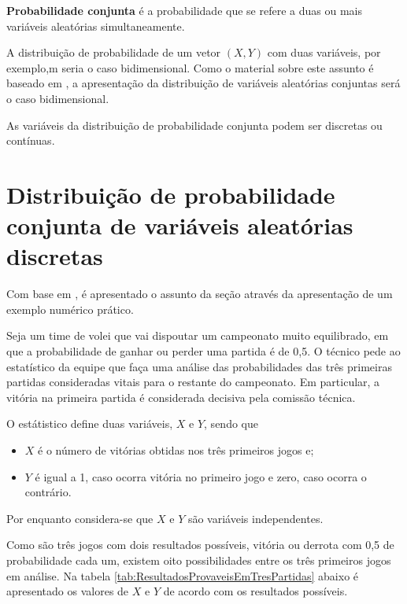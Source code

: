 \documentclass[
]{book}
\begin{document}
\textbf{Probabilidade conjunta} é a probabilidade que se refere a duas ou mais variáveis aleatórias simultaneamente.

A distribuição de probabilidade de um vetor \((X,Y)\) com duas variáveis, por exemplo,m seria o caso bidimensional. Como o material sobre este assunto é baseado em \citet{Sartoris2013}, a apresentação da distribuição de variáveis aleatórias conjuntas será o caso bidimensional.

As variáveis da distribuição de probabilidade conjunta podem ser discretas ou contínuas.

\hypertarget{distribuiuxe7uxe3o-de-probabilidade-conjunta-de-variuxe1veis-aleatuxf3rias-discretas}{%
\section{Distribuição de probabilidade conjunta de variáveis aleatórias discretas}\label{distribuiuxe7uxe3o-de-probabilidade-conjunta-de-variuxe1veis-aleatuxf3rias-discretas}}

Com base em \citet{Sartoris2013}, é apresentado o assunto da seção através da apresentação de um exemplo numérico prático.

Seja um time de volei que vai dispoutar um campeonato muito equilibrado, em que a probabilidade de ganhar ou perder uma partida é de 0,5. O técnico pede ao estatístico da equipe que faça uma análise das probabilidades das três primeiras partidas consideradas vitais para o restante do campeonato. Em particular, a vitória na primeira partida é considerada decisiva pela comissão técnica.

O estátistico define duas variáveis, \(X\) e \(Y\), sendo que

\begin{itemize}
\item
  \(X\) é o número de vitórias obtidas nos três primeiros jogos e;
\item
  \(Y\) é igual a 1, caso ocorra vitória no primeiro jogo e zero, caso ocorra o contrário.
\end{itemize}

Por enquanto considera-se que \(X\) e \(Y\) são variáveis independentes.

Como são três jogos com dois resultados possíveis, vitória ou derrota com 0,5 de probabilidade cada um, existem oito possibilidades entre os três primeiros jogos em análise. Na tabela \ref{tab:ResultadosProvaveisEmTresPartidas} abaixo é apresentado os valores de \(X\) e \(Y\) de acordo com os resultados possíveis.
\end{document}
